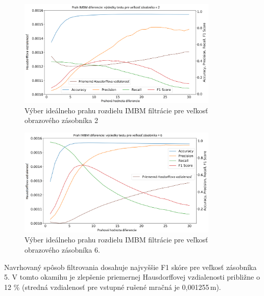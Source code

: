 \begin{figure}[H]
	\centering
	\includegraphics[width=0.85\textwidth]{figures/imbm_th_2.png}
	\caption{Výber ideálneho prahu rozdielu IMBM filtrácie pre veľkosť obrazového zásobníka 2}
	\label{fig:imbmth:a}
\end{figure}

\begin{figure}[H]
	\centering
	\includegraphics[width=0.85\textwidth]{figures/imbm_th_6.png}
	\caption{Výber ideálneho prahu rozdielu IMBM filtrácie pre veľkosť obrazového zásobníka 6.}
	\label{fig:imbmth:b}
\end{figure}

Navrhovaný spôsob filtrovania dosahuje najvyššie F1 skóre pre veľkosť zásobníka 5. V tomto okamihu je zlepšenie priemernej Hausdorffovej vzdialenosti približne o 12 \% (stredná vzdialenosť pre vstupné rušené mračná je 0,001255\,m).

